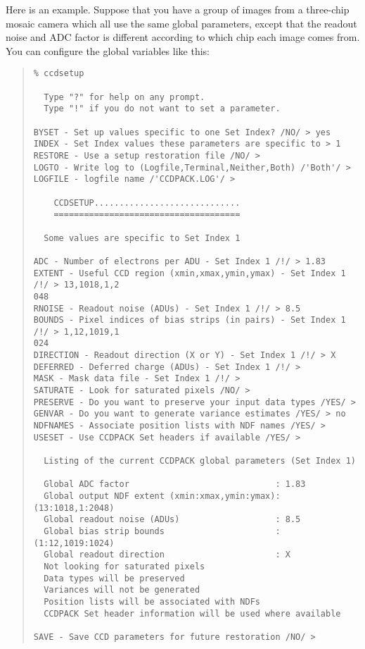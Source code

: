 \documentclass[twoside,11pt]{article}
\newcommand{\latexhtml}[2]{#1}
\renewcommand{\_}{\texttt{\symbol{95}}}
\newcommand{\ttsize}{\latexhtml{\small}{}}
\newenvironment{myquote}{\begin{quote}\ttsize}{\end{quote}}
\begin{document}
Here is an example. 
Suppose that you have a group of images from a three-chip
mosaic camera which all use the same global parameters, except that 
the readout noise and ADC factor is different according to which
chip each image comes from.
You can configure the global variables like this:
\begin{myquote}
\begin{verbatim}
% ccdsetup

  Type "?" for help on any prompt.
  Type "!" if you do not want to set a parameter.

BYSET - Set up values specific to one Set Index? /NO/ > yes
INDEX - Set Index values these parameters are specific to > 1
RESTORE - Use a setup restoration file /NO/ > 
LOGTO - Write log to (Logfile,Terminal,Neither,Both) /'Both'/ > 
LOGFILE - logfile name /'CCDPACK.LOG'/ > 

    CCDSETUP.............................
    =====================================

  Some values are specific to Set Index 1

ADC - Number of electrons per ADU - Set Index 1 /!/ > 1.83
EXTENT - Useful CCD region (xmin,xmax,ymin,ymax) - Set Index 1 /!/ > 13,1018,1,2
048
RNOISE - Readout noise (ADUs) - Set Index 1 /!/ > 8.5
BOUNDS - Pixel indices of bias strips (in pairs) - Set Index 1 /!/ > 1,12,1019,1
024
DIRECTION - Readout direction (X or Y) - Set Index 1 /!/ > X
DEFERRED - Deferred charge (ADUs) - Set Index 1 /!/ > 
MASK - Mask data file - Set Index 1 /!/ >
SATURATE - Look for saturated pixels /NO/ > 
PRESERVE - Do you want to preserve your input data types /YES/ > 
GENVAR - Do you want to generate variance estimates /YES/ > no
NDFNAMES - Associate position lists with NDF names /YES/ > 
USESET - Use CCDPACK Set headers if available /YES/ > 

  Listing of the current CCDPACK global parameters (Set Index 1)

  Global ADC factor                             : 1.83
  Global output NDF extent (xmin:xmax,ymin:ymax): (13:1018,1:2048)
  Global readout noise (ADUs)                   : 8.5
  Global bias strip bounds                      : (1:12,1019:1024)
  Global readout direction                      : X
  Not looking for saturated pixels
  Data types will be preserved
  Variances will not be generated
  Position lists will be associated with NDFs
  CCDPACK Set header information will be used where available

SAVE - Save CCD parameters for future restoration /NO/ > 
\end{verbatim}
\end{myquote}
\end{document}
